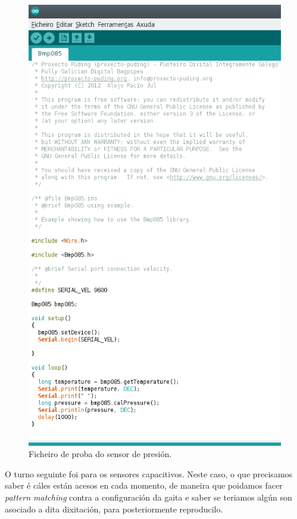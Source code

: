    \begin{figure}[htbp]
    \centering
    \includegraphics[scale=0.8,keepaspectratio=true]{./imagenes/test-sensor-presion.png}
    \caption{Ficheiro de proba do sensor de presión.}
    \label{figura:TestSensorPresion}
   \end{figure}
   
   O turno seguinte foi para os sensores capacitivos. Neste caso, o que
   precisamos saber é cáles están acesos en cada momento, de maneira que
   poidamos facer \textit{pattern matching} contra a configuración da gaita e
   saber se teriamos algún son asociado a dita dixitación, para posteriormente
   reproducilo. \\
   
